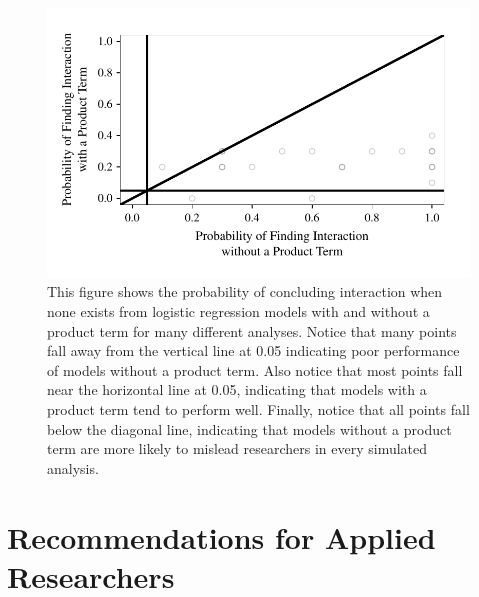 \documentclass[12pt]{article}
\begin{document}
\begin{figure}[H]
\begin{center}
\includegraphics[scale = .9]{fig/fig-scatter.pdf}
\end{center}\caption{This figure shows the probability of concluding interaction when none exists from logistic regression models with and without a product term for many different analyses. Notice that many points fall away from the vertical line at 0.05 indicating poor performance of models without a product term. Also notice that most points fall near the horizontal line at 0.05, indicating that models with a product term tend to perform well. Finally, notice that  all points fall below the diagonal line, indicating that models without a product term are more likely to mislead researchers in every simulated analysis.}\label{fig:scatter}
\end{figure}

\section*{Recommendations for Applied Researchers}
\end{document}
